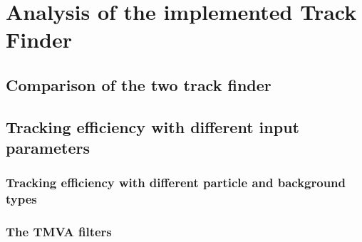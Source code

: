 \chapter{Analysis of the implemented Track Finder}
\section{Comparison of the two track finder}
\section{Tracking efficiency with different input parameters}
\subsection{Tracking efficiency with different particle and background types}
\subsection{The TMVA filters}